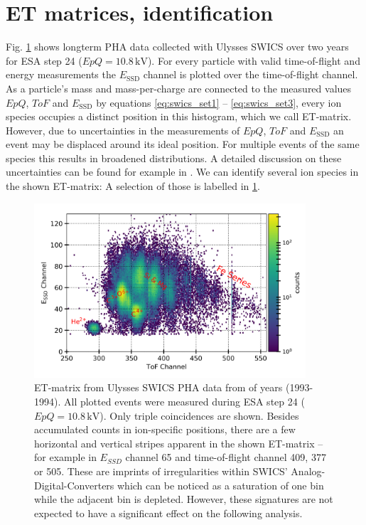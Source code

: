 \section{ET matrices, identification}
\label{sec:etmatrices}
Fig. \ref{fig:et_matrix} shows longterm PHA data collected with Ulysses SWICS over two years for ESA step 24 ($EpQ = 10.8\,\mathrm{kV}$). For every particle with valid time-of-flight and energy measurements the $E_{\mathrm{SSD}}$ channel is plotted over the time-of-flight channel. As a particle's mass and mass-per-charge are connected to the measured values $EpQ$, $ToF$ and $E_{\mathrm{SSD}}$ by equations \ref{eq:swics_set1} --  \ref{eq:swics_set3}, every ion species occupies a distinct position in this histogram, which we call ET-matrix. 
However, due to uncertainties in the measurements of $EpQ$, $ToF$ and $E_{\mathrm{SSD}}$ an event may be displaced around its ideal position. 
For multiple events of the same species this results in broadened distributions. A detailed discussion on these uncertainties can be found for example in \citet{lars-phd}.
We can identify several ion species in the shown ET-matrix: A selection of those is labelled in \ref{fig:et_matrix}.



\begin{figure}[h]
	\includegraphics[width=0.9\textwidth]{Figures/et_matrix_labels.png}
	\centering
	\caption{ET-matrix from Ulysses SWICS PHA data from of years (1993-1994). All plotted events were measured during ESA step 24 ($EpQ = 10.8\,\mathrm{kV}$). Only triple coincidences are shown. Besides accumulated counts in ion-specific positions, there are a few horizontal and vertical stripes apparent in the shown ET-matrix -- for example in $E_{SSD}$ channel 65 and time-of-flight channel 409, 377 or 505. These are imprints of irregularities within SWICS' Analog-Digital-Converters which can be noticed as a saturation of one bin while the adjacent bin is depleted. However, these signatures are not expected to have a significant effect on the following analysis.}
	\label{fig:et_matrix}
\end{figure}


